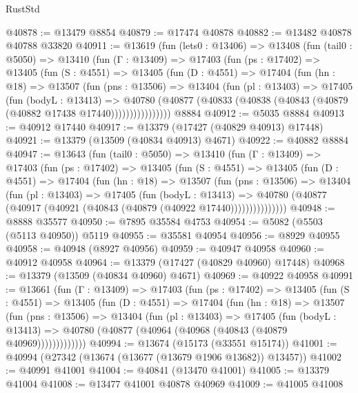 \begin{lexlean}{RustStd}
\begin{coremodule}
@40878 := @13479 @8854
@40879 := @17474 @40878
@40882 := @13482 @40878 @40788 @33820
@40911 := @13619
    (fun (lets0 : @13406) =>
    @13408
      (fun (tail0 : @5050) =>
      @13410
        (fun (Γ : @13409) =>
        @17403
          (fun (ps : @17402) =>
          @13405
            (fun (S : @4551) =>
            @13405
              (fun (D : @4551) =>
              @17404
                (fun (hn : @18) =>
                @13507
                  (fun (pns : @13506) =>
                  @13404
                    (fun (pl : @13403) =>
                    @17405
                      (fun (bodyL : @13413) =>
                      @40780
                        (@40877
                          (@40833 (@40838 (@40843 (@40879 (@40882 @17438 @17440))))))))))))))))
    @8884
@40912 := @5035 @8884
@40913 := @40912 @17440
@40917 := @13379 (@17427 (@40829 @40913) @17448)
@40921 := @13379 (@13509 (@40834 @40913) @4671)
@40922 := @40882 @8884
@40947 := @13643
    (fun (tail0 : @5050) =>
    @13410
      (fun (Γ : @13409) =>
      @17403
        (fun (ps : @17402) =>
        @13405
          (fun (S : @4551) =>
          @13405
            (fun (D : @4551) =>
            @17404
              (fun (hn : @18) =>
              @13507
                (fun (pns : @13506) =>
                @13404
                  (fun (pl : @13403) =>
                  @17405
                    (fun (bodyL : @13413) =>
                    @40780 (@40877 (@40917 (@40921 (@40843 (@40879 (@40922 @17440)))))))))))))))
@40948 := @8888 @35577
@40950 := @7895 @35584 @4753
@40954 := @5082 (@5503 (@5113 @40950)) @5119
@40955 := @35581 @40954
@40956 := @8929 @40955
@40958 := @40948 (@8927 @40956)
@40959 := @40947 @40958
@40960 := @40912 @40958
@40964 := @13379 (@17427 (@40829 @40960) @17448)
@40968 := @13379 (@13509 (@40834 @40960) @4671)
@40969 := @40922 @40958
@40991 := @13661
    (fun (Γ : @13409) =>
    @17403
      (fun (ps : @17402) =>
      @13405
        (fun (S : @4551) =>
        @13405
          (fun (D : @4551) =>
          @17404
            (fun (hn : @18) =>
            @13507
              (fun (pns : @13506) =>
              @13404
                (fun (pl : @13403) =>
                @17405
                  (fun (bodyL : @13413) =>
                  @40780 (@40877 (@40964 (@40968 (@40843 (@40879 @40969)))))))))))))
@40994 := @13674 (@15173 (@33551 @15174))
@41001 := @40994 (@27342 (@13674 (@13677 (@13679 @1906 @13682)) @13457))
@41002 := @40991 @41001
@41004 := @40841 (@13470 @41001)
@41005 := @13379 @41004
@41008 := @13477 @41001 @40878 @40969
@41009 := @41005 @41008

\end{coremodule}
\end{lexlean}
